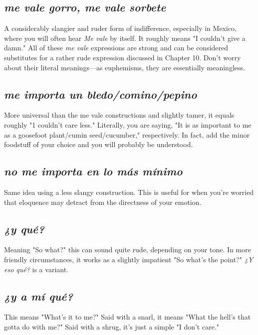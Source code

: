 \subsection{\emph{me vale gorro, me vale sorbete}}

A considerably slangier and ruder form of indifference, especially in Mexico, where you will often hear \emph{Me vale} by itself. It
roughly means "I couldn't give a damn." All of these \emph{me vale} expressions are strong and can be considered substitutes for a rather rude
expression discussed in Chapter 10. Don't worry about their literal meanings---as euphemisms, they are essentially meaningless.

\subsection{\emph{me importa un bledo/comino/pepino}}

More universal than the me vale constructions and slightly
tamer, it equals roughly "1 couldn't care less." Literally, you are saying,
"It is as important to me as a goosefoot plant/cumin seed/cucumber,"
respectively. In fact, add the minor foodstuff of your choice and you
will probably be understood.

\subsection{\emph{no me importa en lo más mínimo}}

Same idea using a less slangy construction. This is useful for
when you're worried that eloquence may detract from the directness of
your emotion.

\subsection{\emph{¿y qué?}}

Meaning "So what?" this can sound quite rude, depending on
your tone. In more friendly circumstances, it works as a slightly impatient "So what's the point?" \emph{¿Y eso qué?} is a variant.

\subsection{\emph{¿y a mí qué?}}

This means "What's it to me?" Said with a snarl, it means
"What the hell's that gotta do with me?" Said with a shrug, it's just a
simple "I don't care."

